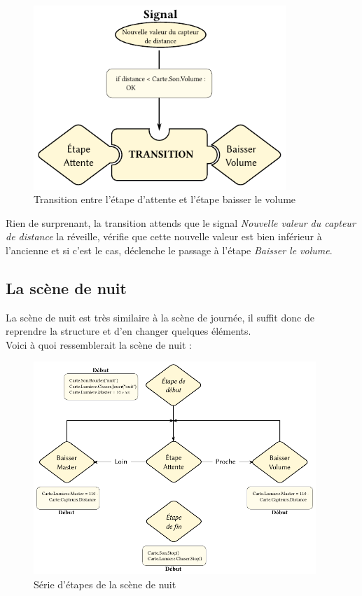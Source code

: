 \begin{figure}[htbp]
  \centering
  \includegraphics[width=0.85\textwidth]{figs/transition_poubelle.pdf}
  \caption{Transition entre l'étape d'attente et l'étape baisser le volume}
  \label{fig:ex_poubelle_transition_proche}
  \vspace{-25pt}
\end{figure} \p
Rien de surprenant, la transition attends que le signal \textit{Nouvelle valeur du capteur de distance} la réveille, vérifie que cette nouvelle valeur est bien inférieur à l'ancienne et si c'est le cas, déclenche le passage à l'étape \textit{Baisser le volume}.

\newpage
\subsection{La scène de nuit}
La scène de nuit est très similaire à la scène de journée, il suffit donc de reprendre la structure et d'en changer quelques éléments.\\
Voici à quoi ressemblerait la scène de nuit :
\begin{figure}[htbp]
  \centering
  \includegraphics[width=0.95\textwidth]{figs/etapes_poubelle_nuit.pdf}
  \caption{Série d'étapes de la scène de nuit}
  \label{fig:ex_poubelle_etapes_nuit}
\end{figure} ~\\

